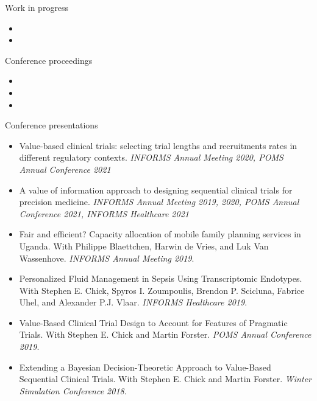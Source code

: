 \documentclass{resume}
\begin{document}
\begin{rSection}{Work in progress}
\begin{itemize}
  \item {}
  \item {}
\end{itemize}
\end{rSection}


\begin{rSection}{Conference proceedings}
\begin{itemize}
\item {}
\item {}
\item {}
\end{itemize}

\end{rSection}

\begin{rSection}{Conference presentations}

\begin{itemize}
\item Value-based clinical trials: selecting trial lengths and recruitments rates in different regulatory contexts. \textit{INFORMS Annual Meeting 2020, POMS Annual Conference 2021}
\item A value of information approach to designing sequential clinical trials for precision medicine. \textit{INFORMS Annual Meeting 2019, 2020, POMS Annual Conference 2021, INFORMS Healthcare 2021}
\item Fair and efficient? Capacity allocation of mobile family planning services in Uganda. With Philippe Blaettchen, Harwin de Vries, and Luk Van Wassenhove. \textit{INFORMS Annual Meeting 2019}.
\item Personalized Fluid Management in Sepsis Using Transcriptomic Endotypes. With Stephen E. Chick, Spyros I. Zoumpoulis, Brendon P. Scicluna, Fabrice Uhel, and Alexander P.J. Vlaar. \textit{INFORMS Healthcare 2019}.
\item Value-Based Clinical Trial Design to Account for Features of Pragmatic Trials. With Stephen E. Chick and Martin Forster. \textit{POMS Annual Conference 2019}.
\item Extending a Bayesian Decision-Theoretic Approach to Value-Based Sequential Clinical Trials. With Stephen E. Chick and Martin Forster. \textit{Winter Simulation Conference 2018}.
\end{itemize}

\end{rSection}
\end{document}
